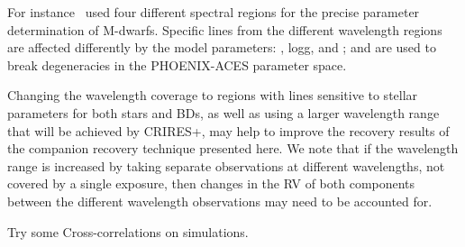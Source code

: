 For instance~\citet{passegger_fundamental_2016} used four different spectral regions for the precise parameter determination of M-dwarfs. Specific lines from the different wavelength regions are affected differently by the model parameters: \teff{}, logg, and \feh{}; and are used to break degeneracies in the {PHOENIX-ACES} parameter space.

Changing the wavelength coverage to regions with lines sensitive to stellar parameters for both stars and BDs, as well as using a larger wavelength range that will be achieved by {CRIRES+}, may help to improve the recovery results of the companion recovery technique presented here. We note that if the wavelength range is increased by taking separate observations at different wavelengths, not covered by a single exposure, then changes in the {RV} of both components between the different wavelength observations may need to be accounted for.







Try some Cross-correlations on simulations.


